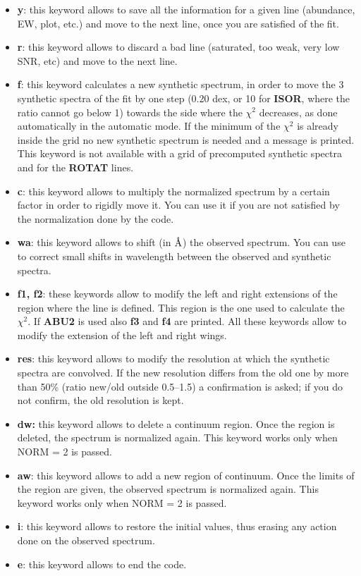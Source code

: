 \documentclass[modern]{aastex701}
\newcommand{\angstrom}{\mbox{\normalfont\AA}}
\begin{document}
\begin{itemize}
    \item {\bf y}: this keyword allows to save all the information for a given line (abundance, EW, plot, etc.) and move to the next line, once you are satisfied of the fit.
    \item {\bf r}: this keyword allows to discard a bad line (saturated, too weak, very low SNR, etc) and move to the next line.
    \item {\bf f}: this keyword calculates a new synthetic spectrum, in order to move the 3 synthetic spectra of the fit by one step (0.20 dex, or 10 for {\bf ISOR}, where the ratio cannot go below 1) towards the side where the $\chi^2$ decreases, as done automatically in the automatic mode. If the minimum of the $\chi^2$ is already inside the grid no new synthetic spectrum is needed and a message is printed. This keyword is not available with a grid of precomputed synthetic spectra and for the {\bf ROTAT} lines.
    \item {\bf c}: this keyword allows to multiply the normalized spectrum by a certain factor in order to rigidly move it. You can use it if you are not satisfied by the normalization done by the code. 
    \item {\bf wa}: this keyword allows to shift (in $\angstrom$) the observed spectrum. You can use to correct small shifts in wavelength between the observed and synthetic spectra. 
    \item {\bf f1, f2}: these keywords allow to modify the left and right extensions of the region where the line is defined. This region is the one used to calculate the $\chi^2$. If {\bf ABU2} is used also {\bf f3} and {\bf f4} are printed. All these keywords allow to modify the extension of the left and right wings.
    \item {\bf res}: this keyword allows to modify the resolution at which the synthetic spectra are convolved. If the new resolution differs from the old one by more than 50\% (ratio new/old outside 0.5--1.5) a confirmation is asked; if you do not confirm, the old resolution is kept. 
    \item {\bf dw:} this keyword allows to delete a continuum region. Once the region is deleted, the spectrum is normalized again. This keyword works only when NORM = 2 is passed. 
    \item {\bf aw}: this keyword allows to add a new region of continuum. Once the limits of the region are given, the observed spectrum is normalized again. This keyword works only when NORM = 2 is passed.
    \item {\bf i}: this keyword allows to restore the initial values, thus erasing any action done on the observed spectrum. 
    \item {\bf e}: this keyword allows to end the code. 
\end{itemize}
\end{document}
